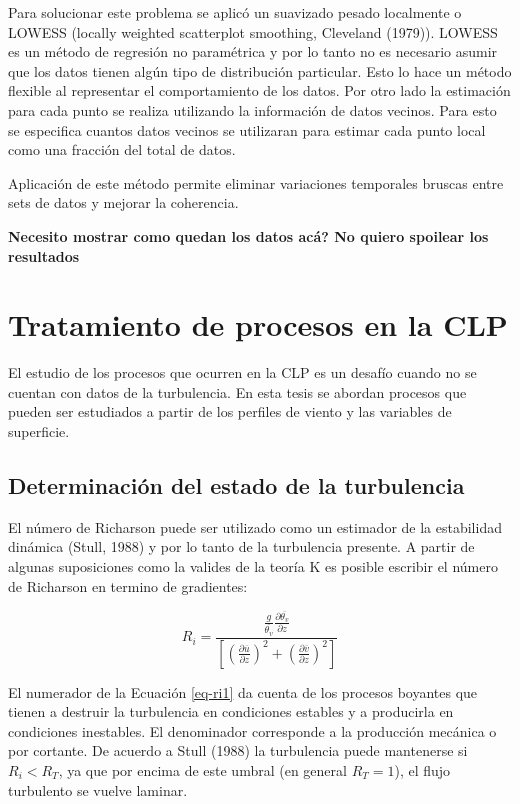 \documentclass[12pt,spanish,oneside]{book}
\begin{document}
Para solucionar este problema se aplicó un suavizado pesado localmente o
LOWESS (locally weighted scatterplot smoothing, Cleveland (1979)).
LOWESS es un método de regresión no paramétrica y por lo tanto no es
necesario asumir que los datos tienen algún tipo de distribución
particular. Esto lo hace un método flexible al representar el
comportamiento de los datos. Por otro lado la estimación para cada punto
se realiza utilizando la información de datos vecinos. Para esto se
especifica cuantos datos vecinos se utilizaran para estimar cada punto
local como una fracción del total de datos.

Aplicación de este método permite eliminar variaciones temporales
bruscas entre sets de datos y mejorar la coherencia.

\textbf{Necesito mostrar como quedan los datos acá? No quiero spoilear
los resultados}

\section{Tratamiento de procesos en la
CLP}\label{tratamiento-de-procesos-en-la-clp}

El estudio de los procesos que ocurren en la CLP es un desafío cuando no
se cuentan con datos de la turbulencia. En esta tesis se abordan
procesos que pueden ser estudiados a partir de los perfiles de viento y
las variables de superficie.

\subsection{Determinación del estado de la
turbulencia}\label{determinacion-del-estado-de-la-turbulencia}

El número de Richarson puede ser utilizado como un estimador de la
estabilidad dinámica (Stull, 1988) y por lo tanto de la turbulencia
presente. A partir de algunas suposiciones como la valides de la teoría
K es posible escribir el número de Richarson en termino de gradientes:

\begin{equation} \label{eq-ri1}
R_i = \frac{\frac{g}{\overline{\theta_v}} \frac{\partial \overline{\theta_v}}{\partial z}}
{\left [ \left (\frac{\partial \overline{u}}{\partial z} \right )^2 + \left (\frac{\partial \overline{v}}{\partial z} \right )^2  \right]}
\end{equation}

El numerador de la Ecuación \ref{eq-ri1} da cuenta de los procesos
boyantes que tienen a destruir la turbulencia en condiciones estables y
a producirla en condiciones inestables. El denominador corresponde a la
producción mecánica o por cortante. De acuerdo a Stull (1988) la
turbulencia puede mantenerse si \(R_i < R_T\), ya que por encima de este
umbral (en general \(R_T = 1\)), el flujo turbulento se vuelve laminar.
\end{document}
